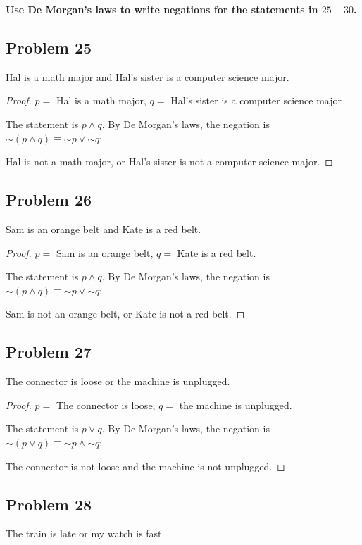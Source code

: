 \documentclass[14pt]{extarticle}
\begin{document}
{\bf Use De Morgan’s laws to write negations for the statements in $25-30$.}

\subsection{Problem 25}
Hal is a math major and Hal’s sister is a computer science major.

\begin{proof}
$p =$ Hal is a math major, $q =$ Hal’s sister is a computer science major

The statement is $p \wedge q$. By De Morgan's laws, the negation is $\sim(p \wedge q) \equiv {\sim p} \vee {\sim q}$:

Hal is not a math major, or Hal's sister is not a computer science major.
\end{proof}

\subsection{Problem 26}
Sam is an orange belt and Kate is a red belt.

\begin{proof}
$p =$ Sam is an orange belt, $q =$ Kate is a red belt.

The statement is $p \wedge q$. By De Morgan's laws, the negation is $\sim(p \wedge q) \equiv {\sim p} \vee {\sim q}$:

Sam is not an orange belt, or Kate is not a red belt.
\end{proof}

\subsection{Problem 27}
The connector is loose or the machine is unplugged.

\begin{proof}
$p =$ The connector is loose, $q =$ the machine is unplugged.

The statement is $p \vee q$. By De Morgan's laws, the negation is $\sim(p \vee q) \equiv {\sim p} \wedge {\sim q}$:

The connector is not loose and the machine is not unplugged.
\end{proof}

\subsection{Problem 28}
The train is late or my watch is fast.
\end{document}
